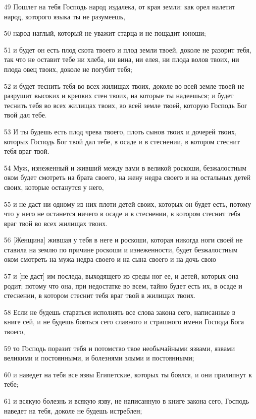 \par 49 Пошлет на тебя Господь народ издалека, от края земли: как орел налетит народ, которого языка ты не разумеешь,
\par 50 народ наглый, который не уважит старца и не пощадит юноши;
\par 51 и будет он есть плод скота твоего и плод земли твоей, доколе не разорит тебя, так что не оставит тебе ни хлеба, ни вина, ни елея, ни плода волов твоих, ни плода овец твоих, доколе не погубит тебя;
\par 52 и будет теснить тебя во всех жилищах твоих, доколе во всей земле твоей не разрушит высоких и крепких стен твоих, на которые ты надеешься; и будет теснить тебя во всех жилищах твоих, во всей земле твоей, которую Господь Бог твой дал тебе.
\par 53 И ты будешь есть плод чрева твоего, плоть сынов твоих и дочерей твоих, которых Господь Бог твой дал тебе, в осаде и в стеснении, в котором стеснит тебя враг твой.
\par 54 Муж, изнеженный и живший между вами в великой роскоши, безжалостным оком будет смотреть на брата своего, на жену недра своего и на остальных детей своих, которые останутся у него,
\par 55 и не даст ни одному из них плоти детей своих, которых он будет есть, потому что у него не останется ничего в осаде и в стеснении, в котором стеснит тебя враг твой во всех жилищах твоих.
\par 56 [Женщина] жившая у тебя в неге и роскоши, которая никогда ноги своей не ставила на землю по причине роскоши и изнеженности, будет безжалостным оком смотреть на мужа недра своего и на сына своего и на дочь свою
\par 57 и [не даст] им последа, выходящего из среды ног ее, и детей, которых она родит; потому что она, при недостатке во всем, тайно будет есть их, в осаде и стеснении, в котором стеснит тебя враг твой в жилищах твоих.
\par 58 Если не будешь стараться исполнять все слова закона сего, написанные в книге сей, и не будешь бояться сего славного и страшного имени Господа Бога твоего,
\par 59 то Господь поразит тебя и потомство твое необычайными язвами, язвами великими и постоянными, и болезнями злыми и постоянными;
\par 60 и наведет на тебя все язвы Египетские, которых ты боялся, и они прилипнут к тебе;
\par 61 и всякую болезнь и всякую язву, не написанную в книге закона сего, Господь наведет на тебя, доколе не будешь истреблен;

